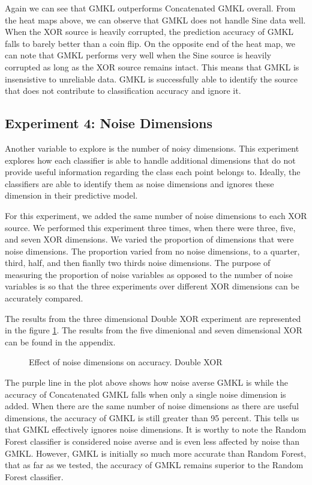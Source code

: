\documentclass{article}
\begin{document}
Again we can see that GMKL outperforms Concatenated GMKL overall. From the heat
maps above, we can observe that GMKL does not handle Sine data well. When the
XOR source is heavily corrupted, the prediction accuracy of GMKL falls to
barely better than a coin flip. On the opposite end of the heat map, we can
note that GMKL performs very well when the Sine source is heavily corrupted as
long as the XOR source remains intact. This means that GMKL is insensistive to
unreliable data. GMKL is successfully able to identify the source that does not
contribute to classification accuracy and ignore it.



\subsection*{Experiment 4: Noise Dimensions}

Another variable to explore is the number of noisy dimensions. This experiment
explores how each classifier is able to handle additional dimensions that do
not provide useful information regarding the class each point belongs to.
Ideally, the classifiers are able to identify them as noise dimensions and
ignores these dimension in their predictive model.

For this experiment, we added the same number of noise dimensions to each XOR
source. We performed this experiment three times, when there were three, five,
and seven XOR dimensions. We varied the proportion of dimensions that were
noise dimensions. The proportion varied from no noise dimensions, to a quarter,
third, half, and then fianlly two thirds noise dimensions. The purpose of
measuring the proportion of noise variables as opposed to the number of noise
variables is so that the three experiments over different XOR dimensions can be
accurately compared.

The results from the three dimensional Double XOR experiment are represented in
the figure \ref{fig:exp_4}. The results from the five dimenional and seven
dimensional XOR can be found in the appendix.

\begin{figure}
    \label{fig:exp_4}
    \caption{Effect of noise dimensions on accuracy. Double XOR}
\end{figure}

The purple line in the plot above shows how noise averse GMKL is while the
accuracy of Concatenated GMKL falls when only a single noise dimension is
added. When there are the same number of noise dimensions as there are useful
dimensions, the accuracy of GMKL is still greater than 95 percent. This tells
us that GMKL effectively ignores noise dimensions. It is worthy to note the
Random Forest classifier is considered noise averse and is even less affected
by noise than GMKL. However, GMKL is initially so much more accurate than
Random Forest, that as far as we tested, the accuracy of GMKL remains superior
to the Random Forest classifier.
\end{document}
